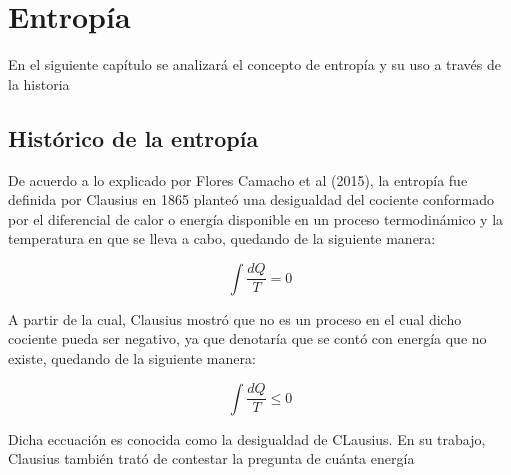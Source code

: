 

\section{Entropía}
En el siguiente capítulo se analizará el concepto de entropía y su uso a través de la historia

\subsection{Histórico de la entropía}
De acuerdo a lo explicado por Flores Camacho et al (2015), la entropía fue definida por Clausius en 1865 planteó una desigualdad del cociente conformado por el diferencial de calor o energía disponible en un proceso termodinámico y la temperatura en que se lleva a cabo, quedando de la siguiente manera:

\begin{equation}
    \int \frac{dQ}{T} = 0
\end{equation}

A partir de la cual, Clausius mostró que no es un proceso en el cual dicho cociente pueda ser negativo, ya que denotaría que se contó con energía que no existe, quedando de la siguiente manera:

\begin{equation}
    \int \frac{dQ}{T} \leq 0
\end{equation}


Dicha eccuación es conocida como la desigualdad de CLausius. En su trabajo, Clausius también trató de contestar la pregunta de cuánta energía 
